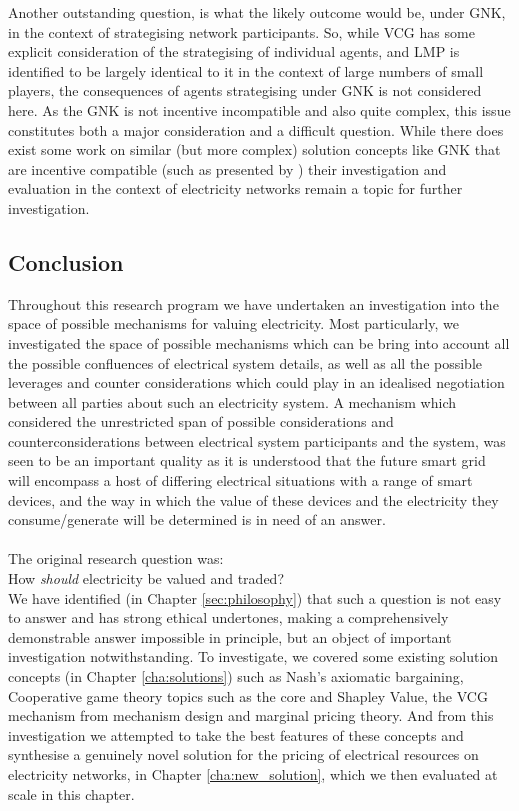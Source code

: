 Another outstanding question, is what the likely outcome would be, under GNK, in the context of strategising network participants.
So, while VCG has some explicit consideration of the strategising of individual agents, and LMP is identified to be largely identical to it in the context of large numbers of small players, the consequences of agents strategising under GNK is not considered here.
As the GNK is not incentive incompatible and also quite complex, this issue constitutes both a major consideration and a difficult question.
While there does exist some work on similar (but more complex) solution concepts like GNK that are incentive compatible (such as presented by \cite{myerson1,Salamanca2019}) their investigation and evaluation in the context of electricity networks remain a topic for further investigation.



\subsection{Conclusion}
\label{cha:conc}

Throughout this research program we have undertaken an investigation into the space of possible mechanisms for valuing electricity.
Most particularly, we investigated the space of possible mechanisms which can be bring into account all the possible confluences of electrical system details, as well as all the possible leverages and counter considerations which could play in an idealised negotiation between all parties about such an electricity system.
A mechanism which considered the unrestricted span of possible considerations and counterconsiderations between electrical system participants and the system, was seen to be an important quality as it is understood that the future smart grid will encompass a host of differing electrical situations with a range of smart devices, and the way in which the value of these devices and the electricity they consume/generate will be determined is in need of an answer.\\
\\\noindent
The original research question was:\\
\-\hspace{1cm}How \textit{should} electricity be valued and traded?\\

We have identified (in Chapter \ref{sec:philosophy}) that such a question is not easy to answer and has strong ethical undertones, making a comprehensively demonstrable answer impossible in principle, but an object of important investigation notwithstanding.
To investigate, we covered some existing solution concepts (in Chapter \ref{cha:solutions}) such as Nash's axiomatic bargaining, Cooperative game theory topics such as the core and Shapley Value, the VCG mechanism from mechanism design and marginal pricing theory.
And from this investigation we attempted to take the best features of these concepts and synthesise a genuinely novel solution for the pricing of electrical resources on electricity networks, in Chapter \ref{cha:new_solution}, which we then evaluated at scale in this chapter.

